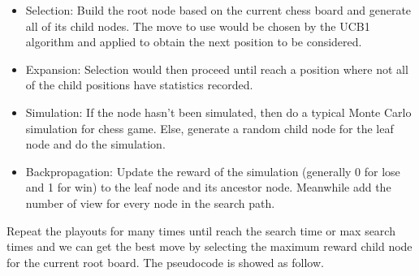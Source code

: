 \documentclass[12pt,a4paper]{article}
\begin{document}
\begin{itemize}
\item Selection:
Build the root node based on the current chess board and generate all of its child nodes. The move to use would be chosen by the UCB1 algorithm and applied to obtain the next position to be considered. 
\item Expansion:
Selection would then proceed until reach a position where not all of the child positions have statistics recorded. 
\item Simulation:
If the node hasn't been simulated, then do a typical Monte Carlo simulation for chess game. Else, generate a random child node for the leaf node and do the simulation.
\item Backpropagation:
Update the reward of the simulation (generally 0 for lose and 1 for win) to the leaf node and its ancestor node. Meanwhile add the number of view for every node in the search path.
\end{itemize}
\par Repeat the playouts for many times until reach the search time or max search times and we can get the best move by selecting the maximum reward child node for the current root board. The pseudocode is showed as follow.
\end{document}

